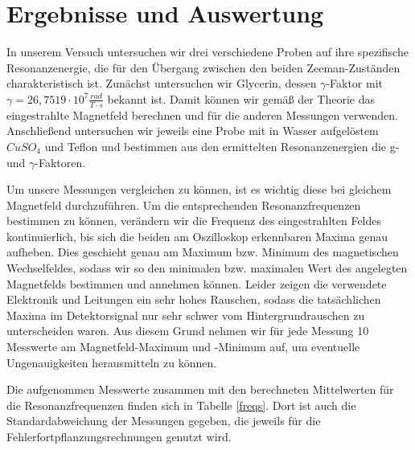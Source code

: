\section{Ergebnisse und Auswertung}
In unserem Versuch untersuchen wir drei verschiedene Proben auf ihre spezifische Resonanzenergie, die für den Übergang zwischen den beiden Zeeman-Zuständen charakteristisch ist. Zunächst untersuchen wir Glycerin, dessen $\gamma$-Faktor mit $\gamma=26,7519\cdot 10^7\frac{rad}{T\cdot s}$ \cite{anleitung} bekannt ist. Damit können wir gemäß der Theorie das eingestrahlte Magnetfeld berechnen und für die anderen Messungen verwenden. Anschließend untersuchen wir jeweils eine Probe mit in Wasser aufgelöstem $CuSO_4$ und Teflon und bestimmen aus den ermittelten Resonanzenergien die g- und $\gamma$-Faktoren.

Um unsere Messungen vergleichen zu können, ist es wichtig diese bei gleichem Magnetfeld durchzuführen. Um die entsprechenden Resonanzfrequenzen bestimmen zu können, verändern wir die Frequenz des eingestrahlten Feldes kontinuierlich, bis sich die beiden am Oszilloskop erkennbaren Maxima genau aufheben. Dies geschieht genau am Maximum bzw. Minimum des magnetischen Wechselfeldes, sodass wir so den minimalen bzw. maximalen Wert des angelegten Magnetfelds bestimmen und annehmen können. Leider zeigen die verwendete Elektronik und Leitungen ein sehr hohes Rauschen, sodass die tatsächlichen Maxima im Detektorsignal nur sehr schwer vom Hintergrundrauschen zu unterscheiden waren. Aus diesem Grund nehmen wir für jede Messung 10 Messwerte am Magnetfeld-Maximum und -Minimum auf, um eventuelle Ungenauigkeiten herausmitteln zu können. 

Die aufgenommen Messwerte zusammen mit den berechneten Mittelwerten für die Resonanzfrequenzen finden sich in Tabelle \ref{freqs}. Dort ist auch die Standardabweichung der Messungen gegeben, die jeweils für die Fehlerfortpflanzungsrechnungen genutzt wird.  

